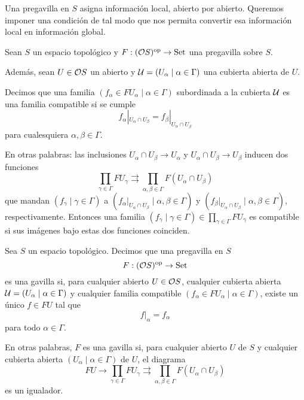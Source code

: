 Una pregavilla en $S$ asigna información local, abierto por abierto.
Queremos imponer una condición de tal modo que nos permita
convertir esa información local en información global.

\begin{defn}
    Sean $S$ un espacio topológico y $F:(\cal OS)^\op\to\Con$
    una pregavilla sobre $S$.
    
    Además, sean $U\in\cal OS$ un abierto y
    $\cal U = (U_\alpha\mid\alpha\in \Gamma)$
    una cubierta abierta de $U$.
    
    Decimos que una familia
    $(f_\alpha\in FU_\alpha\mid\alpha\in\Gamma)$
    subordinada a la cubierta $\cal U$
    es una familia compatible si se cumple
    \[
        f_\alpha|_{U_\alpha\cap U_\beta}
        =
        f_\beta|_{U_\alpha\cap U_\beta}
    \]
    para cualesquiera $\alpha,\beta\in\Gamma$.
    
    En otras palabras: las inclusiones
    $U_\alpha\cap U_\beta\to U_\alpha$
    y $U_\alpha\cap U_\beta\to U_\beta$ inducen
    dos funciones
    \[
        \prod_{\gamma\in\Gamma}FU_\gamma
        \rightrightarrows
        \prod_{\alpha,\beta\in\Gamma}F(U_\alpha\cap U_\beta)
    \]
    que mandan $(f_\gamma\mid\gamma\in\Gamma)$
    a $(f_\alpha|_{U_\alpha\cap U_\beta}\mid\alpha,\beta\in\Gamma)$
    y $(f_\beta|_{U_\alpha\cap U_\beta}\mid\alpha,\beta\in\Gamma)$,
    respectivamente.
    Entonces una familia
    $(f_\gamma\mid\gamma\in\Gamma)\in\prod_{\gamma\in\Gamma}FU_\gamma$
    es compatible si sus imágenes bajo estas dos funciones coinciden.
\end{defn}

\begin{defn}
    Sea $S$ un espacio topológico.
    Decimos que una pregavilla en $S$
    \[
        F:(\cal OS)^\op\to\Con
    \]
    es una gavilla si,
    para cualquier abierto $U\in\cal OS$, cualquier cubierta abierta
    $\cal U=(U_\alpha\mid \alpha\in\Gamma)$
    y cualquier familia compatible
    $(f_\alpha\in FU_\alpha\mid \alpha\in\Gamma)$,
    existe un único $f\in FU$ tal que
    \[
        f|_\alpha = f_\alpha
    \]
    para todo $\alpha\in\Gamma$.
    
    En otras palabras, $F$ es una gavilla si,
    para cualquier abierto $U$ de $S$ y
    cualquier cubierta abierta
    $(U_\alpha\mid\alpha\in\Gamma)$ de $U$,
    el diagrama
    \[
        FU
        \to
        \prod_{\gamma\in\Gamma} FU_\gamma
        \rightrightarrows
        \prod_{\alpha,\beta\in\Gamma}F(U_\alpha\cap U_\beta)
    \]
    es un igualador.
\end{defn}


